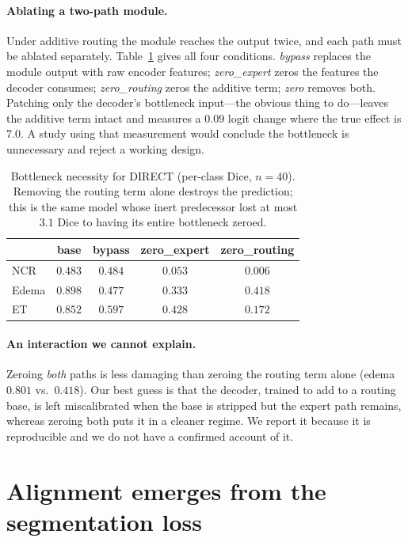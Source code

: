 \documentclass[10pt,twocolumn,letterpaper]{article}
\begin{document}
\paragraph{Ablating a two-path module.}
Under additive routing the module reaches the output twice, and each path must be ablated
separately. Table~\ref{tab:necessityfull} gives all four conditions. \emph{bypass} replaces
the module output with raw encoder features; \emph{zero\_expert} zeros the features the
decoder consumes; \emph{zero\_routing} zeros the additive term; \emph{zero} removes both.
Patching only the decoder's bottleneck input---the obvious thing to do---leaves the additive
term intact and measures a $0.09$ logit change where the true effect is $7.0$. A study using
that measurement would conclude the bottleneck is unnecessary and reject a working design.

\begin{table}[t]\centering\footnotesize
\setlength{\tabcolsep}{4pt}
\caption{Bottleneck necessity for DIRECT (per-class Dice, $n{=}40$). Removing the routing
term alone destroys the prediction; this is the same model whose inert predecessor lost at
most $3.1$ Dice to having its entire bottleneck zeroed.}
\label{tab:necessityfull}
\begin{tabular}{lcccc}
\toprule
& base & bypass & zero\_expert & \textbf{zero\_routing} \\
\midrule
NCR   & $0.483$ & $0.484$ & $0.053$ & $\mathbf{0.006}$ \\
Edema & $0.898$ & $0.477$ & $0.333$ & $\mathbf{0.418}$ \\
ET    & $0.852$ & $0.597$ & $0.428$ & $\mathbf{0.172}$ \\
\bottomrule
\end{tabular}
\end{table}

\paragraph{An interaction we cannot explain.}
Zeroing \emph{both} paths is less damaging than zeroing the routing term alone (edema
$0.801$ vs.\ $0.418$). Our best guess is that the decoder, trained to add to a routing base,
is left miscalibrated when the base is stripped but the expert path remains, whereas zeroing
both puts it in a cleaner regime. We report it because it is reproducible and we do not have
a confirmed account of it.

\section{Alignment emerges from the segmentation loss}
\label{sec:emergence}
\end{document}
